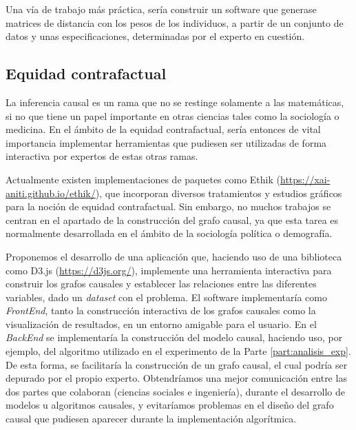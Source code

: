 \documentclass[oneside,openright,titlepage,numbers=noenddot,openany,headinclude,footinclude=true,
cleardoublepage=empty,abstractoff,BCOR=5mm,paper=a4,fontsize=12pt,main=spanish]{scrreprt}
\begin{document}
Una vía de trabajo más práctica, sería construir un software que generase matrices de distancia con los pesos de los individuos, a partir de un conjunto de datos y unas especificaciones, determinadas por el experto en cuestión.

\subsection*{Equidad contrafactual}

La inferencia causal es un rama que no se restinge solamente a las matemáticas, si no que tiene un papel importante en otras ciencias tales como la sociología o medicina. En el ámbito de la equidad contrafactual, sería entonces de vital importancia implementar herramientas que pudiesen ser utilizadas de forma interactiva por expertos de estas otras ramas.

Actualmente existen implementaciones de paquetes como Ethik (\url{https://xai-aniti.github.io/ethik/}), que incorporan diversos tratamientos y estudios gráficos para la noción de equidad contrafactual. Sin embargo, no muchos trabajos se centran en el apartado de la construcción del grafo causal, ya que esta tarea es normalmente desarrollada en el ámbito de la sociología política o demografía.

Proponemos el desarrollo de una aplicación que, haciendo uso de una biblioteca como D3.js (\url{https://d3js.org/}), implemente una herramienta interactiva para construir los grafos causales y establecer las relaciones entre las diferentes variables, dado un \textit{dataset} con el problema. El software implementaría como \textit{FrontEnd}, tanto la construcción interactiva de los grafos causales como la visualización de resultados, en un entorno amigable para el usuario. En el \textit{BackEnd} se implementaría la construcción del modelo causal, haciendo uso, por ejemplo, del algoritmo utilizado en el experimento de la Parte \ref{part:analisis_exp}. De esta forma, se facilitaría la construcción de un grafo causal, el cual podría ser depurado por el propio experto. Obtendríamos una mejor comunicación entre las dos partes que colaboran (ciencias sociales e ingeniería), durante el desarrollo de modelos u algoritmos causales, y evitaríamos problemas en el diseño del grafo causal que pudiesen aparecer durante la implementación algorítmica.





\end{document}
